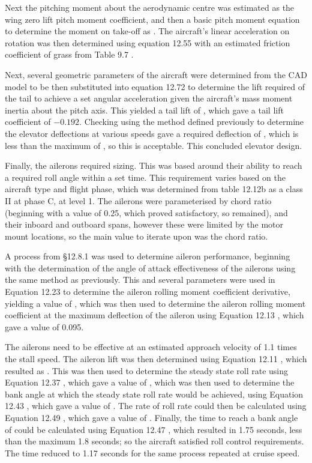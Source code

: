 \documentclass[../../main.tex]{subfiles}
\begin{document}
Next the pitching moment about the aerodynamic centre was estimated as the wing zero lift pitch moment coefficient, and then a basic pitch moment equation to determine the moment on take-off as .
The aircraft's linear acceleration on rotation was then determined using equation 12.55 \cite{sadraey-13} with an estimated friction coefficient of grass from Table 9.7 \cite{sadraey-13}. 

Next, several geometric parameters of the aircraft were determined from the CAD model to be then substituted into equation 12.72 \cite{sadraey-13} to determine the lift required of the tail to achieve a set angular acceleration given the aircraft's mass moment inertia about the pitch axis.
This yielded a tail lift of , which gave a tail lift coefficient of $-0.192$.
Checking using the method defined previously to determine the elevator deflections at various speeds gave a required deflection of , which is less than the maximum of , so this is acceptable.
This concluded elevator design. 

Finally, the ailerons required sizing.
This was based around their ability to reach a required roll angle within a set time.
This requirement varies based on the aircraft type and flight phase, which was determined from table 12.12b  as a class II at phase C, at level 1.
The ailerons were parameterised by chord ratio (beginning with a value of 0.25, which proved satisfactory, so remained), and their inboard and outboard spans, however these were limited by the motor mount locations, so the main value to iterate upon was the chord ratio.  

A process from \S 12.8.1 \cite{sadraey-13} was used to determine aileron performance, beginning with the determination of the angle of attack effectiveness of the ailerons using the same method as previously.
This and several parameters were used in Equation 12.23 \cite{sadraey-13} to determine the aileron rolling moment coefficient derivative, yielding a value of , which was then used to determine the aileron rolling moment coefficient at the maximum deflection of the aileron using Equation 12.13 \cite{sadraey-13}, which gave a value of 0.095. 

The ailerons need to be effective at an estimated approach velocity of 1.1 times the stall speed.
The aileron lift was then determined using Equation 12.11 \cite{sadraey-13}, which resulted as .
This was then used to determine the steady state roll rate using Equation 12.37 \cite{sadraey-13}, which gave a value of , which was then used to determine the bank angle at which the steady state roll rate would be achieved, using Equation 12.43 \cite{sadraey-13}, which gave a value of .
The rate of roll rate could then be calculated using Equation 12.49 \cite{sadraey-13}, which gave a value of .
Finally, the time to reach a bank angle of  could be calculated using Equation 12.47 \cite{sadraey-13}, which resulted in 1.75 seconds, less than the maximum 1.8 seconds; so the aircraft satisfied roll control requirements.
The time reduced to 1.17 seconds for the same process repeated at cruise speed. 
\end{document}
